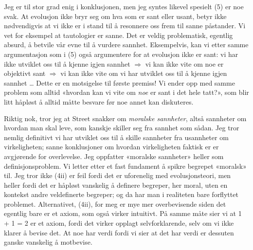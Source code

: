 \documentclass[a4paper,norsk]{article}
\begin{document}
Jeg er til stor grad enig i konklusjonen, men jeg syntes likevel spesielt (5)
er noe svak. At evolusjon ikke bryr seg om hva som er sant eller usant, betyr
ikke nødvendigvis at vi ikke er i stand til å resonnere oss frem til sanne
påstander. Vi vet for eksempel at tautologier er sanne. Det er veldig
problematisk, egentlig absurd, å betvile vår evne til å vurdere sannhet.
Eksempelvis, kan vi etter samme argumentasjon som i (5) også argumentere for at
evolusjon ikke er sant: vi har ikke utviklet oss til å kjenne igjen sannhet
$\Longrightarrow$ vi kan ikke vite om noe er objektivt sant $\Longrightarrow$
vi kan ikke vite om vi har utviklet oss til å kjenne igjen sannhet \ldots{}
Dette er en motsigelse til første premiss! Vi ender opp med samme problem som
alltid «hvordan kan vi vite om \emph{noe} er sant i det hele tatt?», som blir
litt håpløst å alltid måtte besvare før noe annet kan diskuteres.

Riktig nok, tror jeg at Street snakker om \emph{moralske sannheter}, altså
sannheter om hvordan man skal leve, som kanskje skiller seg fra sannhet som
sådan. Jeg tror nemlig definitivt vi har utviklet oss til å skille sannheter
fra usannheter om virkeligheten; sanne konklusjoner om hvordan virkeligheten
faktisk er er avgjørende for overlevelse. Jeg oppfatter «moralske sannheter»
heller som definisjonsproblem. Vi letter etter et fast fundament å spikre
begrepet «moralsk» til. Jeg tror ikke (4ii) er feil fordi det er uforenelig med
evolusjonsteori, men heller fordi det er håpløst vanskelig å definere begreper,
her moral, uten en kontekst andre veldefinerte begreper; og da har man i
realiteten bare forflyttet problemet. Alternativet, (4ii), for meg er mye mer
overbevisende siden det egentlig bare er et axiom, som også virker intuitivt.
På samme måte sier vi at 1 + 1 = 2 er et axiom, fordi det virker opplagt
selvforklarende, selv om vi ikke klarer å bevise det. At noe har verdi fordi vi
sier at det har verdi er dessuten ganske vanskelig å motbevise.
\end{document}
